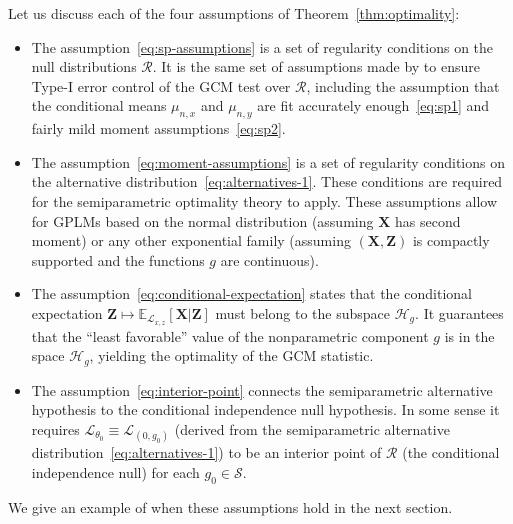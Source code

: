 \documentclass[aos]{imsart}
\theoremstyle{plain}
\theoremstyle{remark}
\newcommand{\E}{\mathbb E}								%
\newcommand{\prx}{\bm X}								%
\newcommand{\prz}{\bm Z}								%
\newcommand{\law}{\mathcal L}							%
\newcommand{\regclass}{\mathscr R}					    %
\renewcommand{\H}{\mathcal H}		 					%
\begin{document}
\noindent Let us discuss each of the four assumptions of Theorem~\ref{thm:optimality}:
\begin{itemize}
    \item The assumption~\eqref{eq:sp-assumptions} is a set of regularity conditions on the null distributions $\regclass$. It is the same set of assumptions made by \citet{Shah2018} to ensure Type-I error control of the GCM test over $\regclass$, including the assumption that the conditional means $\mu_{n,x}$ and $\mu_{n,y}$ are fit accurately enough~\eqref{eq:sp1} and fairly mild moment assumptions~\eqref{eq:sp2}.
    \item The assumption~\eqref{eq:moment-assumptions} is a set of regularity conditions on the alternative distribution~\eqref{eq:alternatives-1}. These conditions are required for the semiparametric optimality theory to apply. These assumptions allow for GPLMs based on the normal distribution (assuming $\prx$ has second moment) or any other exponential family (assuming $(\prx, \prz)$ is compactly supported and the functions $g$ are continuous).
    \item The assumption~\eqref{eq:conditional-expectation} states that the conditional expectation $\prz \mapsto \E_{\law_{x,z}}[\prx|\prz]$ must belong to the subspace $\H_g$. It guarantees that the ``least favorable'' value of the nonparametric component $g$ is in the space $\H_g$, yielding the optimality of the GCM statistic.
    \item The assumption~\eqref{eq:interior-point} connects the semiparametric alternative hypothesis to the conditional independence null hypothesis. In some sense it requires $\law_{\theta_0} \equiv \law_{(0, g_0)}$ (derived from the semiparametric alternative distribution~\eqref{eq:alternatives-1}) to be an interior point of $\regclass$ (the conditional independence null) for each $g_0 \in \mathcal S$.
\end{itemize}
We give an example of when these assumptions hold in the next section.
\end{document}
